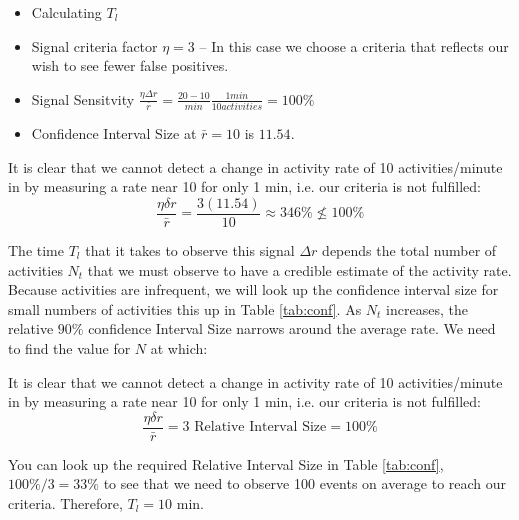 \documentclass{article}
\begin{document}
\begin{itemize}
\item Calculating $T_{l}$
\item Signal criteria factor $\eta=3$ -- In this case we choose a criteria that reflects our wish to see fewer false positives.
\item Signal Sensitvity $\frac{\eta \Delta r}{\bar{r}} = \frac{20-10}{min} \frac{1 min}{10 activities}= 100\%$
\item Confidence Interval Size at $\bar{r} =10$ is $11.54$.
\end{itemize}

It is clear that we cannot detect a change in activity rate of 10 activities/minute in by measuring a rate near 10 for only 1 min, i.e. our criteria is not fulfilled:
\begin{equation}
    \label{eq:ex2:notmet}
    \frac{\eta \delta r}{\bar{r}} = \frac{3(11.54)}{10} \approx 346\% \not\le 100\% 
\end{equation}

The time $T_{l}$ that it takes to observe this signal $\Delta r$ depends the total number of activities $N_t$ that we must observe to have a credible estimate of the activity rate. Because activities are infrequent, we will look up the confidence interval size for small numbers of activities this up in Table \ref{tab:conf}.  As $N_t$ increases, the relative $90\%$ confidence Interval Size narrows around the average rate.  We need to find the value for $N$ at which:

It is clear that we cannot detect a change in activity rate of 10 activities/minute in by measuring a rate near 10 for only 1 min, i.e. our criteria is not fulfilled:
\begin{equation}
    \label{eq:ex2:met}
    \frac{\eta \delta r}{\bar{r}} = 3 \text{ Relative Interval Size} = 100\% 
\end{equation}

You can look up the required Relative Interval Size in Table \ref{tab:conf}, $100\%/3 = 33\%$ to see that we need to observe 100 events on average to reach our criteria. Therefore, $T_l = 10$ min.
\end{document}
